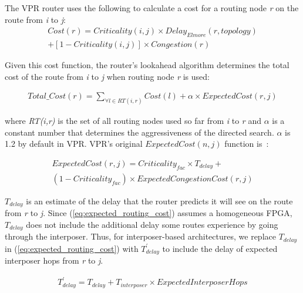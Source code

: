 \documentclass[journal]{IEEEtran}
\begin{document}
The VPR router uses the following to calculate a cost for a routing node \textit{r} on the route from \textit{i} to \textit{j}:
\setlength{\arraycolsep}{0.0em}
\begin{multline}
\label{eq:routing_cost}
Cost(r) = Criticality(i,j) \times Delay_{Elmore}(r, topology) \\ + [1-Criticality(i,j)] \times Congestion(r)
\end{multline}
\setlength{\arraycolsep}{5pt}

Given this cost function, the router's lookahead algorithm determines the total cost of the route from \textit{i} to \textit{j} when routing node \textit{r} is used:

\setlength{\arraycolsep}{0.0em}
\begin{multline}
\label{eq:lookahead_cost}
Total\_Cost(r) = \sum_{\forall l \in RT(i,r)} Cost(l) + \alpha \times ExpectedCost(r,j)
\end{multline}
\setlength{\arraycolsep}{5pt}

where \textit{RT(i,r)} is the set of all routing nodes used so far from \textit{i} to \textit{r} and $\alpha$ is a constant number that determines the aggressiveness of the directed search. $\alpha$ is 1.2 by default in VPR. VPR's original $ExpectedCost(n,j)$ function is~\cite{betz1999architecture}: 

\setlength{\arraycolsep}{0.0em}
\begin{multline}
\label{eq:expected_routing_cost}
ExpectedCost(r,j) = Criticality_{fac} \times T_{delay} + \\(1 - Criticality_{fac}) \times ExpectedCongestionCost(r,j)
\end{multline}
\setlength{\arraycolsep}{5pt}

$T_{delay}$ is an estimate of the delay that the router predicts it will see on the route from \textit{r} to \textit{j}. Since (\ref{eq:expected_routing_cost}) assumes a homogeneous FPGA, $T_{delay}$ does not include the additional delay some routes experience by going through the interposer. Thus, for interposer-based architectures, we replace $T_{delay}$ in (\ref{eq:expected_routing_cost}) with $T^\prime_{delay}$ to include the delay of expected interposer hops from \textit{r} to \textit{j}.

\begin{multline}
\label{eq:tdelay}
T^\prime_{delay} = T_{delay} + T_{interposer} \times ExpectedInterposerHops
\end{multline}
\setlength{\arraycolsep}{5pt}
\end{document}
